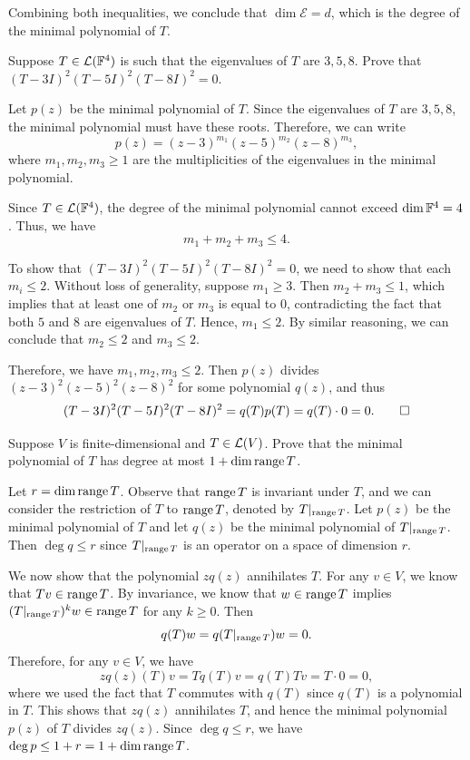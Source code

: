 \begin{exc}
\begin{solution}
Combining both inequalities, we conclude that $\dim\mathcal{E}=d$, which is
the degree of the minimal polynomial of $T$.
\end{solution}

\begin{exercise}
Suppose $T\in\mathcal{L}(\mathbb{F}^4)$ is such that the eigenvalues of $T$ are $3,5,8$.
Prove that $(T-3I)^2(T-5I)^2(T-8I)^2=0$.
\end{exercise}
\begin{solution}
Let $p(z)$ be the minimal polynomial of $T$. Since the eigenvalues of $T$ are
$3,5,8$, the minimal polynomial must have these roots. Therefore, we can write
\[ p(z)=(z-3)^{m_1}(z-5)^{m_2}(z-8)^{m_3}, \]
where $m_1,m_2,m_3\ge1$ are the multiplicities of the eigenvalues in the
minimal polynomial.

Since $T\in\mathcal{L}(\mathbb{F}^4)$, the degree of the minimal polynomial cannot exceed
$\operatorname{dim}\mathbb{F}^4=4$. Thus, we have
\[ m_1+m_2+m_3\le4. \]

To show that $(T-3I)^2(T-5I)^2(T-8I)^2=0$, we need to show that each
$m_i\le2$. Without loss of generality, suppose $m_1\ge3$. Then
$m_2+m_3\le1$, which implies that at least one of $m_2$ or $m_3$ is equal to
$0$, contradicting the fact that both $5$ and $8$ are eigenvalues of $T$.
Hence, $m_1\le2$. By similar reasoning, we can conclude that $m_2\le2$ and
$m_3\le2$.

Therefore, we have $m_1,m_2,m_3\le2$. Then $p(z)$ divides
$(z-3)^2(z-5)^2(z-8)^2$ for some polynomial $q(z)$, and thus
\[ (T-3I)^2(T-5I)^2(T-8I)^2=q(T)p(T)=q(T)\cdot0=0. \qedhere \]
\end{solution}

\begin{exercise}
Suppose $V$ is finite-dimensional and $T\in\mathcal{L}(V)$. Prove that the minimal
polynomial of $T$ has degree at most $1+\operatorname{dim}\operatorname{range} T$.
\end{exercise}
\begin{solution}
Let $r=\operatorname{dim}\operatorname{range} T$. Observe that $\operatorname{range} T$ is invariant under $T$, and we
can consider the restriction of $T$ to $\operatorname{range} T$, denoted by
$T|_{\operatorname{range} T}$. Let $p(z)$ be the minimal polynomial of $T$ and let $q(z)$ be
the minimal polynomial of $T|_{\operatorname{range} T}$. Then $\deg q\le r$ since
$T|_{\operatorname{range} T}$ is an operator on a space of dimension $r$.

We now show that the polynomial $zq(z)$ annihilates $T$. For any $v\in V$, we
know that $Tv\in\operatorname{range} T$. By invariance, we know that $w\in\operatorname{range} T$ implies
$(T|_{\operatorname{range} T})^kw\in\operatorname{range} T$ for any $k\ge0$. Then
\[ q(T)w=q(T|_{\operatorname{range} T})w=0. \]
Therefore, for any $v\in V$, we have
\[ zq(z)(T)v=Tq(T)v=q(T)Tv=T\cdot0=0, \]
where we used the fact that $T$ commutes with $q(T)$ since $q(T)$ is a
polynomial in $T$. This shows that $zq(z)$ annihilates $T$, and hence the
minimal polynomial $p(z)$ of $T$ divides $zq(z)$. Since $\deg q\le r$, we have
$\deg p\le1+r=1+\operatorname{dim}\operatorname{range} T$.
\end{solution}


\end{exc}
